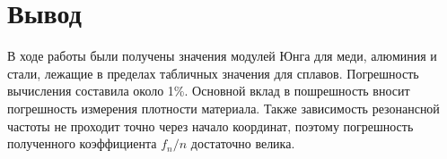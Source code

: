 \documentclass[a4paper,12 pt]{article}
\begin{document}
\section{Вывод}

В ходе работы были получены значения модулей Юнга для меди, алюминия и стали, лежащие в пределах табличных значения для сплавов. Погрешность вычисления составила около 1\%. Основной вклад в пошрешность вносит погрешность измерения плотности материала. Также зависимость резонансной частоты не проходит точно через начало координат, поэтому погрешность полученного коэффициента $f_n/n$ достаточно велика. 
    
\end{document}
